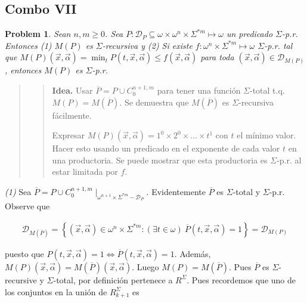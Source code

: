 \documentclass[a4paper, 12pt]{article}
\newtheorem{problem}{Problem}
\newtheorem{problem}{Problem}
\begin{document}
\pagebreak

\subsection{Combo VII}

\begin{problem}
    Sean $n, m \geq 0$. Sea $P : \mathcal{D}_P \subseteq \omega \times
    \omega^{n} \times \Sigma^{*m} \mapsto \omega$ un predicado $\Sigma$-p.r.
    Entonces \textit{(1)} $M(P)$ es $\Sigma$-recursiva y \textit{(2)} Si existe
    $f: \omega^{n} \times \Sigma^{*m}  \mapsto \omega$ $\Sigma$-p.r.  tal que
    $M(P)(\vec{x}, \vec{\alpha}) = \min_t P(t, \vec{x}, \vec{\alpha}) \leq
    f(\vec{x}, \vec{\alpha})$ para toda $(\vec{x}, \vec{\alpha}) \in
    \mathcal{D}_{M(P)}$, entonces $M(P)$ es $\Sigma$-p.r. 
\end{problem}


\small
\begin{quote}

\begin{quote}
    \textbf{Idea.} Usar $\overline{P} = P \cup C_0^{n + 1, m}$ para tener una
    función $\Sigma$-total t.q. $M(P) = M(\overline{P})$. Se demuestra que
    $M(\overline{P})$ es $\Sigma$-recursiva fácilmente.  

    Expresar $M(P)(\vec{x}, \vec{\alpha})  = 1^{0} \times 2^{0} \times  \ldots
    \times t^{1}$ con $t$ el mínimo valor. Hacer esto usando un predicado en el
    exponente de cada valor $t$ en una productoria. Se puede mostrar que esta
    productoria es $\Sigma$-p.r. al estar limitada por $f$.
\end{quote}

\end{quote}
\normalsize


\textit{(1)} Sea $\overline{P} = P \cup C_0^{n+1, m}\mid_{\omega^{n+1} \times
\Sigma^{*m} - \mathcal{D}_{P}}$. Evidentemente $\overline{P}$ es $\Sigma$-total
y $\Sigma$-p.r. Observe que 

\begin{align*}
    \mathcal{D}_{M(\overline{P})} = \left\{ (\vec{x}, \vec{\alpha}) \in
    \omega^{n} \times \Sigma^{*m} : (\exists t \in \omega) ~ \overline{P}(t,
\vec{x}, \vec{\alpha}) = 1 \right\} = \mathcal{D}_{M(P)}
\end{align*}

puesto que $P(t, \vec{x}, \vec{\alpha}) = 1 \iff \overline{P}(t, \vec{x},
\vec{\alpha}) = 1$. Además, $M(P)(\vec{x}, \vec{\alpha}) =
M(\overline{P})(\vec{x}, \vec{\alpha}) $. Luego $M(P) = M(\overline{P})$. Pues
$\overline{P}$ es $\Sigma$-recursive y $\Sigma$-total, por definición pertenece
a $R^{\Sigma}$. Pues recordemos que uno de los conjuntos en la unión de
$R_{k+1}^{\Sigma}$ es 
\end{document}
